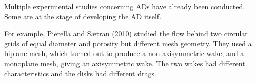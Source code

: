 




Multiple experimental studies concerning ADs have already been conducted. Some are at the stage of developing the AD itself. 

For example, Pierella and Sætran (2010) \cite{Pierella2010} studied the flow behind two circular grids of equal diameter and porosity but different mesh geometry. They used a biplane mesh, which turned out to produce a non-axisymmetric wake, and a monoplane mesh, giving an axisymmetric wake. The two wakes had different characteristics and the disks had different drags.

